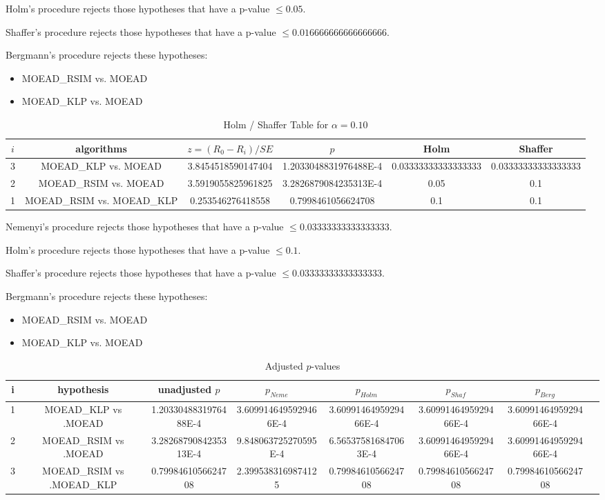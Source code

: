 \documentclass[a4paper,10pt]{article}
\begin{document}
\begin{landscape}
Holm's procedure rejects those hypotheses that have a p-value $\le0.05$.


Shaffer's procedure rejects those hypotheses that have a p-value $\le0.016666666666666666$.


Bergmann's procedure rejects these hypotheses:


\begin{itemize}


\item MOEAD_RSIM vs. MOEAD
\item MOEAD_KLP vs. MOEAD
\end{itemize}


\begin{table}[!htp]
\centering\tiny
\caption{Holm / Shaffer Table for $\alpha=0.10$}
\begin{tabular}{cccccc}
$i$&algorithms&$z=(R_0 - R_i)/SE$&$p$&Holm&Shaffer\\
\hline
3&MOEAD_KLP vs. MOEAD&3.8454518590147404&1.2033048831976488E-4&0.03333333333333333&0.03333333333333333\\
2&MOEAD_RSIM vs. MOEAD&3.5919055825961825&3.2826879084235313E-4&0.05&0.1\\
1&MOEAD_RSIM vs. MOEAD_KLP&0.253546276418558&0.7998461056624708&0.1&0.1\\
\hline
\end{tabular}
\end{table}
Nemenyi's procedure rejects those hypotheses that have a p-value $\le0.03333333333333333$.


Holm's procedure rejects those hypotheses that have a p-value $\le0.1$.


Shaffer's procedure rejects those hypotheses that have a p-value $\le0.03333333333333333$.


Bergmann's procedure rejects these hypotheses:


\begin{itemize}


\item MOEAD_RSIM vs. MOEAD
\item MOEAD_KLP vs. MOEAD
\end{itemize}


\begin{table}[!htp]
\centering\tiny
\caption{Adjusted $p$-values}
\begin{tabular}{cccccccc}
i&hypothesis&unadjusted $p$&$p_{Neme}$&$p_{Holm}$&$p_{Shaf}$&$p_{Berg}$\\
\hline
1&MOEAD_KLP vs .MOEAD&1.2033048831976488E-4&3.6099146495929466E-4&3.6099146495929466E-4&3.6099146495929466E-4&3.6099146495929466E-4\\
2&MOEAD_RSIM vs .MOEAD&3.2826879084235313E-4&9.848063725270595E-4&6.565375816847063E-4&3.6099146495929466E-4&3.6099146495929466E-4\\
3&MOEAD_RSIM vs .MOEAD_KLP&0.7998461056624708&2.3995383169874125&0.7998461056624708&0.7998461056624708&0.7998461056624708\\
\hline
\end{tabular}
\end{table}

\end{landscape}
\end{document}
